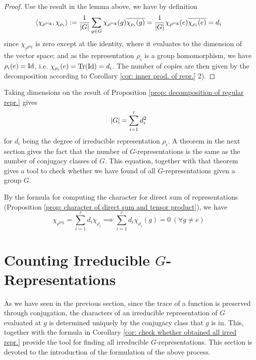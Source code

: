 \documentclass{article}
\begin{document}
\begin{proof}
    Use the result in the lemma above, we have by definition
    \[
        \left\langle \chi_{\rho^{\mathrm{reg}}}, \chi_{\rho_i} \right\rangle := \frac{1}{\left|G\right|} \sum_{g \in G} \chi_{\rho^{\mathrm{reg}}}(g) \overline{\chi_{\rho_i}(g)} = \frac{1}{\left|G\right|} \chi_{\rho^{\mathrm{reg}}}(e) \overline{\chi_{\rho_i}(e)} = d_i
    \]
    since $\chi_{\rho^{\mathrm{reg}}}$ is zero except at the identity, where it evaluates to the dimension of the vector space; and as the representation $\rho_i$ is a group homomorphism, we have $\rho_i(e) = \mathrm{Id}$, i.e. $\chi_{\rho_i}(e) = \operatorname{Tr}(\mathrm{Id}) = d_i$. The number of copies are then given by the decomposition according to Corollary \ref{cor: inner prod. of repr.} 2).
\end{proof}

\begin{corollary}\label{cor: check whether obtained all irred repr.}
    Taking dimensions on the result of Proposition \ref{prop: decomposition of regular repr.} gives
    \[
        \left|G\right| = \sum_{i = 1}^r d_i^2
    \]
    for $d_i$ being the degree of irreducible representation $\rho_i$. A theorem in the next section gives the fact that the number of $G$-representations is the same as the number of conjugacy classes of $G$. This equation, together with that theorem gives a tool to check whether we have found of all $G$-representations given a group $G$. 
\end{corollary}

\begin{corollary}
    By the formula for computing the character for direct sum of representations (Proposition \ref{prop: character of direct sum and tensor product}), we have 
    \[
        \chi_{\rho^{\mathrm{reg}}} = \sum_{i = 1}^r d_i \chi_{\rho_i} \implies \sum_{i = 1}^r d_i \chi_{\rho_i}(g) = 0\ (\forall g \neq e)
    \]
\end{corollary}

\section{Counting Irreducible $G$-Representations}

\textstart
As we have seen in the previous section, since the trace of a function is preserved through conjugation, the characters of an irreducible representation of $G$ evaluated at $g$ is determined uniquely by the conjugacy class that $g$ is in. This, together with the formula in Corollary \ref{cor: check whether obtained all irred repr.} provide the tool for finding all irreducible $G$-representations. This section is devoted to the introduction of the formulation of the above process.
\end{document}
